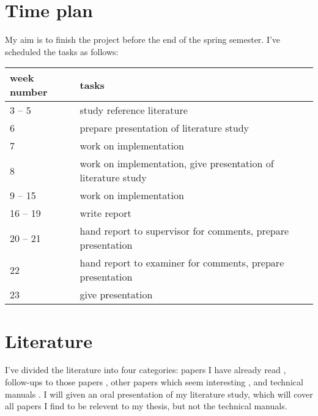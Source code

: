 \documentclass[a4paper,11pt]{kth-mag}
\begin{document}
\section*{Time plan}

My aim is to finish the project before the end of the spring semester.
I've scheduled the tasks as follows:

\begin{table}[h]
\centering
\begin{tabular}{l|l}
week number & tasks \\
\hline
3 -- 5      & study reference literature \\
6           & prepare presentation of literature study \\
7           & work on implementation \\
8           & work on implementation, give presentation of literature study \\
9 -- 15     & work on implementation \\
16 -- 19    & write report \\
20 -- 21    & hand report to supervisor for comments, prepare presentation \\
22          & hand report to examiner for comments, prepare presentation \\
23          & give presentation \\
\end{tabular}
\end{table}

\section*{Literature}

I've divided the literature into four categories:
papers I have already read \cite{massalin87,granlund92,joshi02,bansal06},
follow-ups to those papers \cite{joshi03,joshi06,bansal_thesis},
other papers which seem interesting \cite{bansal08,brain06_iclp,brain06_nmr,crick09,crick_thesis,fraser88,gulwani10,knights09,tate09,tate10},
and technical manuals \cite{intel11_2a,intel11_2b}.
I will given an oral presentation of my literature study, which will cover all papers I find to be relevent to my thesis, but not the technical manuals.


\end{document}
